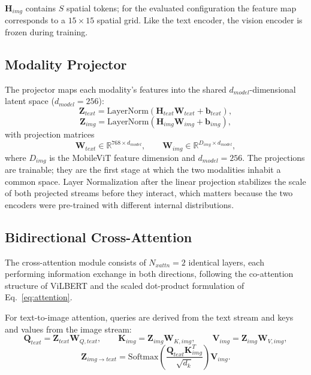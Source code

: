 \documentclass[10pt,twoside]{article}
\begin{document}
$\mathbf{H}_{img}$ contains $S$ spatial tokens; for the evaluated configuration the feature map corresponds to a $15 \times 15$ spatial grid. Like the text encoder, the vision encoder is frozen during training.

\subsection{Modality Projector}\label{sec:projector}

The projector maps each modality's features into the shared $d_{model}$-dimensional latent space ($d_{model} = 256$):
\begin{equation}\label{eq:ztext}
\mathbf{Z}_{text} = \text{LayerNorm}\!\left( \mathbf{H}_{text} \mathbf{W}_{text} + \mathbf{b}_{text} \right),
\end{equation}
\begin{equation}\label{eq:zimg}
\mathbf{Z}_{img} = \text{LayerNorm}\!\left( \mathbf{H}_{img} \mathbf{W}_{img} + \mathbf{b}_{img} \right),
\end{equation}
with projection matrices
\begin{equation}\label{eq:projmats}
\mathbf{W}_{text} \in \mathbb{R}^{768 \times d_{model}}, \qquad \mathbf{W}_{img} \in \mathbb{R}^{D_{img} \times d_{model}},
\end{equation}
where $D_{img}$ is the MobileViT feature dimension and $d_{model} = 256$. The projections are trainable; they are the first stage at which the two modalities inhabit a common space. Layer Normalization after the linear projection stabilizes the scale of both projected streams before they interact, which matters because the two encoders were pre-trained with different internal distributions.

\subsection{Bidirectional Cross-Attention}\label{sec:cross-attention}

The cross-attention module consists of $N_{xattn} = 2$ identical layers, each performing information exchange in both directions, following the co-attention structure of ViLBERT \citep{lu2019vilbert} and the scaled dot-product formulation of Eq.~\eqref{eq:attention}.

For text-to-image attention, queries are derived from the text stream and keys and values from the image stream:
\begin{equation}\label{eq:qkv-t2i}
\mathbf{Q}_{text} = \mathbf{Z}_{text} \mathbf{W}_{Q,text}, \qquad \mathbf{K}_{img} = \mathbf{Z}_{img} \mathbf{W}_{K,img}, \qquad \mathbf{V}_{img} = \mathbf{Z}_{img} \mathbf{W}_{V,img},
\end{equation}
\begin{equation}\label{eq:t2i}
\mathbf{Z}_{img \rightarrow text} = \text{Softmax}\!\left( \frac{\mathbf{Q}_{text} \mathbf{K}_{img}^{T}}{\sqrt{d_k}} \right) \mathbf{V}_{img}.
\end{equation}
\end{document}
